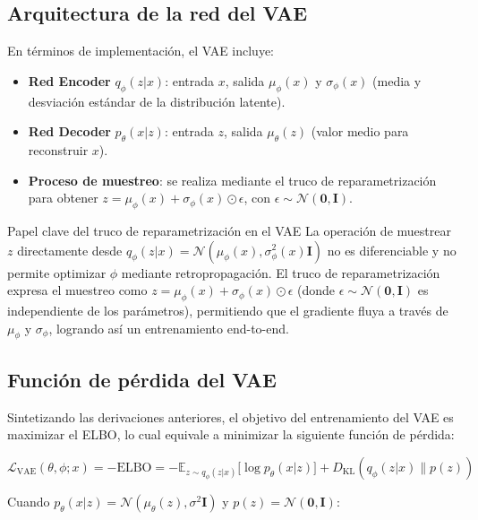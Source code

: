 \subsection{Arquitectura de la red del VAE}

En términos de implementación, el VAE incluye:

\begin{itemize}
    \item \textbf{Red Encoder} $q_\phi(z|x)$: entrada $x$, salida $\mu_\phi(x)$ y $\sigma_\phi(x)$ (media y desviación estándar de la distribución latente).
    \item \textbf{Red Decoder} $p_\theta(x|z)$: entrada $z$, salida $\mu_\theta(z)$ (valor medio para reconstruir $x$).
    \item \textbf{Proceso de muestreo}: se realiza mediante el truco de reparametrización para obtener $z = \mu_\phi(x) + \sigma_\phi(x) \odot \epsilon$, con $\epsilon \sim \mathcal{N}(\mathbf{0}, \mathbf{I})$.
\end{itemize}

\begin{knowledgebox}{Papel clave del truco de reparametrización en el VAE}
La operación de muestrear $z$ directamente desde $q_\phi(z|x) = \mathcal{N}(\mu_\phi(x), \sigma^2_\phi(x) \mathbf{I})$ no es diferenciable y no permite optimizar $\phi$ mediante retropropagación. El truco de reparametrización expresa el muestreo como $z = \mu_\phi(x) + \sigma_\phi(x) \odot \epsilon$ (donde $\epsilon \sim \mathcal{N}(\mathbf{0}, \mathbf{I})$ es independiente de los parámetros), permitiendo que el gradiente fluya a través de $\mu_\phi$ y $\sigma_\phi$, logrando así un entrenamiento end-to-end.
\end{knowledgebox}

\subsection{Función de pérdida del VAE}

Sintetizando las derivaciones anteriores, el objetivo del entrenamiento del VAE es maximizar el ELBO, lo cual equivale a minimizar la siguiente función de pérdida:

$$\mathcal{L}_{\text{VAE}}(\theta, \phi; x) = -\text{ELBO} = -\mathbb{E}_{z \sim q_\phi(z|x)}{[}\log p_\theta(x|z){]} + D_{\mathrm{KL}}(q_\phi(z|x) \| p(z))$$

Cuando $p_\theta(x|z) = \mathcal{N}(\mu_\theta(z), \sigma^2 \mathbf{I})$ y $p(z) = \mathcal{N}(\mathbf{0}, \mathbf{I})$:

